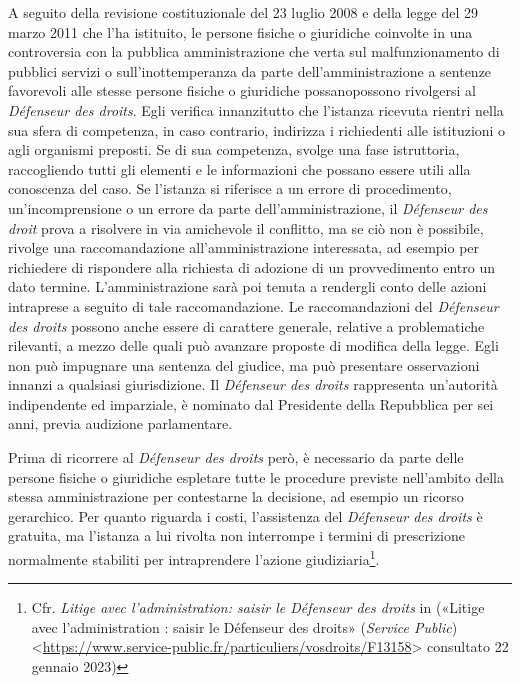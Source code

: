 \documentclass[12pt,it,a4paper,]{report}
\begin{document}
A seguito della revisione costituzionale del 23 luglio 2008 e della
legge del 29 marzo 2011 che l'ha istituito, le persone fisiche o
giuridiche coinvolte in una controversia con la pubblica amministrazione
che verta sul malfunzionamento di pubblici servizi o sull'inottemperanza
da parte dell'amministrazione a sentenze favorevoli alle stesse persone
fisiche o giuridiche possanopossono rivolgersi al \emph{Défenseur des
droits}. Egli verifica innanzitutto che l'istanza ricevuta rientri nella
sua sfera di competenza, in caso contrario, indirizza i richiedenti alle
istituzioni o agli organismi preposti. Se di sua competenza, svolge una
fase istruttoria, raccogliendo tutti gli elementi e le informazioni che
possano essere utili alla conoscenza del caso. Se l'istanza si riferisce
a un errore di procedimento, un'incomprensione o un errore da parte
dell'amministrazione, il \emph{Défenseur des droit} prova a risolvere in
via amichevole il conflitto, ma se ciò non è possibile, rivolge una
raccomandazione all'amministrazione interessata, ad esempio per
richiedere di rispondere alla richiesta di adozione di un provvedimento
entro un dato termine. L'amministrazione sarà poi tenuta a rendergli
conto delle azioni intraprese a seguito di tale raccomandazione. Le
raccomandazioni del \emph{Défenseur des droits} possono anche essere di
carattere generale, relative a problematiche rilevanti, a mezzo delle
quali può avanzare proposte di modifica della legge. Egli non può
impugnare una sentenza del giudice, ma può presentare osservazioni
innanzi a qualsiasi giurisdizione. Il \emph{Défenseur des droits}
rappresenta un'autorità indipendente ed imparziale, è nominato dal
Presidente della Repubblica per sei anni, previa audizione parlamentare.

Prima di ricorrere al \emph{Défenseur des droits} però, è necessario da
parte delle persone fisiche o giuridiche espletare tutte le procedure
previste nell'ambito della stessa amministrazione per contestarne la
decisione, ad esempio un ricorso gerarchico. Per quanto riguarda i
costi, l'assistenza del \emph{Défenseur des droits} è gratuita, ma
l'istanza a lui rivolta non interrompe i termini di prescrizione
normalmente stabiliti per intraprendere l'azione giudiziaria\footnote{Cfr.
  \emph{Litige avec l'administration: saisir le Défenseur des droits} in
  ({«Litige avec l'administration : saisir le Défenseur des droits»}
  (\emph{Service Public})
  \textless{}\url{https://www.service-public.fr/particuliers/vosdroits/F13158}\textgreater{}
  consultato 22 gennaio 2023)}.
\end{document}
